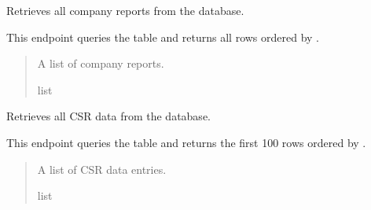 \documentclass[letterpaper,10pt,english]{sphinxmanual}
\begin{document}
\begin{fulllineitems}
\label{\detokenize{my_fastapi:my_fastapi.main.get_all_company_reports}}
\pysigstartsignatures
\pysiglinewithargsret
{}
{}
{}
\pysigstopsignatures
\sphinxAtStartPar
Retrieves all company reports from the database.

\sphinxAtStartPar
This endpoint queries the  table and returns all rows ordered by .
\begin{quote}\begin{description}
\sphinxAtStartPar
A list of company reports.

\sphinxAtStartPar
list

\end{description}\end{quote}

\end{fulllineitems}


\begin{fulllineitems}
\label{\detokenize{my_fastapi:my_fastapi.main.get_all_data}}
\pysigstartsignatures
\pysiglinewithargsret
{}
{}
{}
\pysigstopsignatures
\sphinxAtStartPar
Retrieves all CSR data from the database.

\sphinxAtStartPar
This endpoint queries the  table and returns the first 100 rows ordered by .
\begin{quote}\begin{description}
\sphinxAtStartPar
A list of CSR data entries.

\sphinxAtStartPar
list

\end{description}\end{quote}

\end{fulllineitems}

\end{document}
